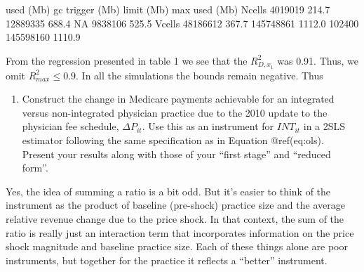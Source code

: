 \documentclass[
  12pt,
]{article}
\providecommand{\tightlist}{%
  \setlength{\itemsep}{0pt}\setlength{\parskip}{0pt}}
\begin{document}
used (Mb) gc trigger (Mb) limit (Mb) max used (Mb) Ncells 4019019 214.7
12889335 688.4 NA 9838106 525.5 Vcells 48186612 367.7 145748861 1112.0
102400 145598160 1110.9

From the regression presented in table 1 we see that the \(R^2_{D,x_1}\)
was 0.91. Thus, we omit \(R^2_{max} \leq 0.9\). In all the simulations
the bounds remain negative. Thus

\begin{enumerate}
\def\labelenumi{\arabic{enumi}.}
\setcounter{enumi}{4}
\tightlist
\item
  Construct the change in Medicare payments achievable for an integrated
  versus non-integrated physician practice due to the 2010 update to the
  physician fee schedule, \(\Delta P_{it}\). Use this as an instrument
  for \(INT_{it}\) in a 2SLS estimator following the same specification
  as in Equation @ref(eq:ols). Present your results along with those of
  your ``first stage'' and ``reduced form''.
\end{enumerate}

Yes, the idea of summing a ratio is a bit odd. But it's easier to think
of the instrument as the product of baseline (pre-shock) practice size
and the average relative revenue change due to the price shock. In that
context, the sum of the ratio is really just an interaction term that
incorporates information on the price shock magnitude and baseline
practice size. Each of these things alone are poor instruments, but
together for the practice it reflects a ``better'' instrument.
\end{document}

